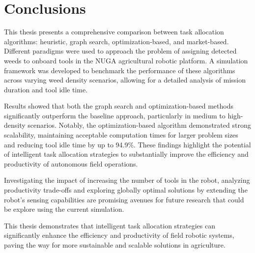 \chapter{Conclusions}\label{ch:conclusions}
This thesis presents a comprehensive comparison between task allocation algorithms: heuristic, graph search, optimization-based, and market-based. Different paradigms were used to approach the problem of assigning detected weeds to onboard tools in the NUGA agricultural robotic platform. A simulation framework was developed to benchmark the performance of these algorithms across varying weed density scenarios, allowing for a detailed analysis of mission duration and tool idle time.

Results showed that both the graph search and optimization-based methods significantly outperform the baseline approach, particularly in medium to high-density scenarios. Notably, the optimization-based algorithm demonstrated strong scalability, maintaining acceptable computation times for larger problem sizes and reducing tool idle time by up to 94.9\%. These findings highlight the potential of intelligent task allocation strategies to substantially improve the efficiency and productivity of autonomous field operations.

Investigating the impact of increasing the number of tools in the robot, analyzing productivity trade-offs and exploring globally optimal solutions by extending the robot's sensing capabilities are promising avenues for future research that could be explore using the current simulation.

This thesis demonstrates that intelligent task allocation strategies can significantly enhance the efficiency and productivity of field robotic systems, paving the way for more sustainable and scalable solutions in agriculture.

